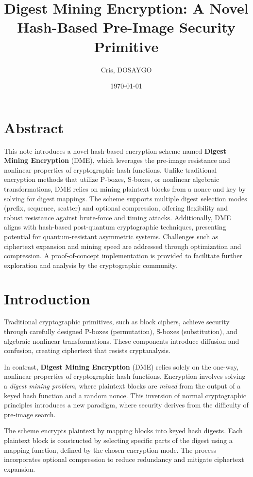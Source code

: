 \documentclass[11pt,a4paper]{article}
\title{Digest Mining Encryption: A Novel Hash-Based Pre-Image Security Primitive}
\author{Cris, DOSAYGO}
\date{\today}
\begin{document}
\maketitle

\section*{Abstract}
This note introduces a novel hash-based encryption scheme named \textbf{Digest Mining Encryption} (DME), which leverages the pre-image resistance and nonlinear properties of cryptographic hash functions. Unlike traditional encryption methods that utilize P-boxes, S-boxes, or nonlinear algebraic transformations, DME relies on mining plaintext blocks from a nonce and key by solving for digest mappings. The scheme supports multiple digest selection modes (prefix, sequence, scatter) and optional compression, offering flexibility and robust resistance against brute-force and timing attacks. Additionally, DME aligns with hash-based post-quantum cryptographic techniques, presenting potential for quantum-resistant asymmetric systems. Challenges such as ciphertext expansion and mining speed are addressed through optimization and compression. A proof-of-concept implementation is provided to facilitate further exploration and analysis by the cryptographic community.

\section*{Introduction}
Traditional cryptographic primitives, such as block ciphers, achieve security through carefully designed P-boxes (permutation), S-boxes (substitution), and algebraic nonlinear transformations. These components introduce diffusion and confusion, creating ciphertext that resists cryptanalysis.

In contrast, \textbf{Digest Mining Encryption} (DME) relies solely on the one-way, nonlinear properties of cryptographic hash functions. Encryption involves solving a \textit{digest mining problem}, where plaintext blocks are \textit{mined} from the output of a keyed hash function and a random nonce. This inversion of normal cryptographic principles introduces a new paradigm, where security derives from the difficulty of pre-image search.

The scheme encrypts plaintext by mapping blocks into keyed hash digests. Each plaintext block is constructed by selecting specific parts of the digest using a mapping function, defined by the chosen encryption mode. The process incorporates optional compression to reduce redundancy and mitigate ciphertext expansion.
\end{document}

